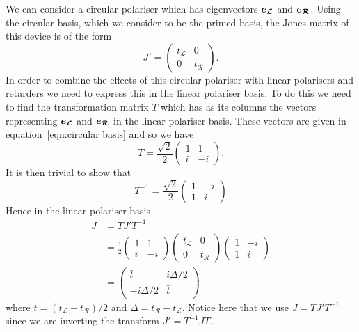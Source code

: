     We can consider a circular polariser which has eigenvectors \(\bm{e_{\mathcal{L}}}\) and \(\bm{e_{\mathcal{R}}}\).
    Using the circular basis, which we consider to be the primed basis, the Jones matrix of this device is of the form
    \[
        J' =
        \begin{pmatrix}
            t_{\mathcal{L}} & 0\\
            0 & t_{\mathcal{R}}
        \end{pmatrix}
        .
    \]
    In order to combine the effects of this circular polariser with linear polarisers and retarders we need to express this in the linear polariser basis.
    To do this we need to find the transformation matrix \(T\) which has as its columns the vectors representing \(\bm{e_{\mathcal{L}}}\) and \(\bm{e_{\mathcal{R}}}\) in the linear polariser basis.
    These vectors are given in equation~\ref{eqn:circular basis} and so we have
    \[
        T = \frac{\sqrt{2}}{2}
        \begin{pmatrix}
            1 & 1\\
            i & -i
        \end{pmatrix}
        .
    \]
    It is then trivial to show that
    \[
        T^{-1} = \frac{\sqrt{2}}{2}
        \begin{pmatrix}
            1 & -i\\
            1 & i
        \end{pmatrix}
    \]
    Hence in the linear polariser basis
    \begin{align*}
        J &= TJ'T^{-1}\\
        &= \frac{1}{2}
        \begin{pmatrix}
            1 & 1\\
            i & -i
        \end{pmatrix}
        \begin{pmatrix}
            t_{\mathcal{L}} & 0\\
            0 & t_{\mathcal{R}}
        \end{pmatrix}
        \begin{pmatrix}
            1 & -i\\
            1 & i
        \end{pmatrix}
        \\
        &=
        \begin{pmatrix}
            \bar{t} & i\Delta/2\\
            -i\Delta/2 & \bar{t}
        \end{pmatrix}
    \end{align*}
    where \(\bar{t} = (t_{\mathcal{L}} + t_{\mathcal{R}})/2\) and \(\Delta = t_{\mathcal{R}} - t_{\mathcal{L}}\).
    Notice here that we use \(J = TJ'T^{-1}\) since we are inverting the transform \(J' = T^{-1}JT\).
    

